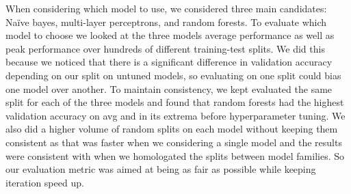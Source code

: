 \documentclass[12pt]{article}
\begin{document}

When considering which model to use, we considered three main candidates: Na\"ive bayes, multi-layer perceptrons, and random forests. To evaluate which model to choose we looked at the three models average performance as well as peak performance over hundreds of different training-test splits. We did this because we noticed that there is a significant difference in validation accuracy depending on our split on untuned models, so evaluating on one split could bias one model over another. To maintain consistency, we kept evaluated the same split for each of the three models and found that random forests had the highest validation accuracy on avg and in its extrema before hyperparameter tuning. We also did a higher volume of random splits on each model without keeping them consistent as that was faster when we considering a single model and the results were consistent with when we homologated the splits between model families. So our evaluation metric was aimed at being as fair as possible while keeping iteration speed up.
\end{document}
